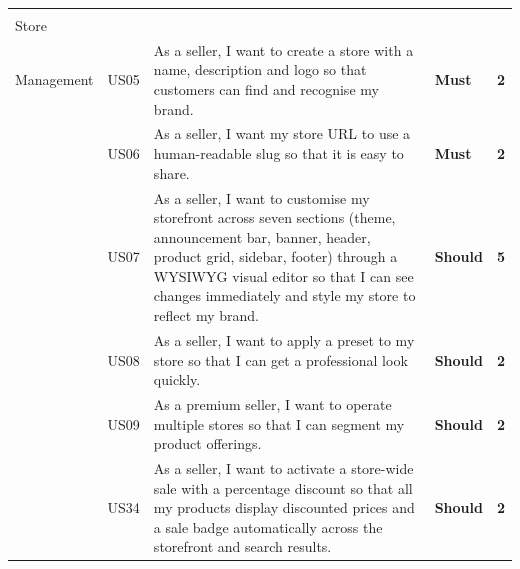 \documentclass[12pt, a4paper, oneside]{report}
\begin{document}
\begin{longtable}{|>{\centering\arraybackslash\small}p{2.2cm}|>{\centering\arraybackslash\small}p{0.9cm}|>{\small}p{7.6cm}|>{\centering\arraybackslash\small}p{1.4cm}|>{\centering\arraybackslash\small}p{0.7cm}|}
  \cellcolor{featStore}\makecell[c]{\textbf{F2}\\\small Store\\Management}
  & US05 & As a seller, I want to create a store with a name, description and logo so that customers can find and recognise my brand.
  & \cellcolor{moscowMust}\textbf{Must} & \cellcolor{complexMed}\textbf{2} \\\hline
  \cellcolor{featStore}~
  & US06 & As a seller, I want my store URL to use a human-readable slug so that it is easy to share.
  & \cellcolor{moscowMust}\textbf{Must} & \cellcolor{complexMed}\textbf{2} \\\hline
  \cellcolor{featStore}~
  & US07 & As a seller, I want to customise my storefront across seven sections (theme, announcement bar, banner, header, product grid, sidebar, footer) through a WYSIWYG visual editor so that I can see changes immediately and style my store to reflect my brand.
  & \cellcolor{moscowShould}\textbf{Should} & \cellcolor{complexVHigh}\textbf{5} \\\hline
  \cellcolor{featStore}~
  & US08 & As a seller, I want to apply a preset to my store so that I can get a professional look quickly.
  & \cellcolor{moscowShould}\textbf{Should} & \cellcolor{complexMed}\textbf{2} \\\hline
  \cellcolor{featStore}~
  & US09 & As a premium seller, I want to operate multiple stores so that I can segment my product offerings.
  & \cellcolor{moscowShould}\textbf{Should} & \cellcolor{complexMed}\textbf{2} \\\hline
  \cellcolor{featStore}~
  & US34 & As a seller, I want to activate a store-wide sale with a percentage discount so that all my products display discounted prices and a sale badge automatically across the storefront and search results.
  & \cellcolor{moscowShould}\textbf{Should} & \cellcolor{complexMed}\textbf{2} \\\hline


\end{longtable}
\end{document}

